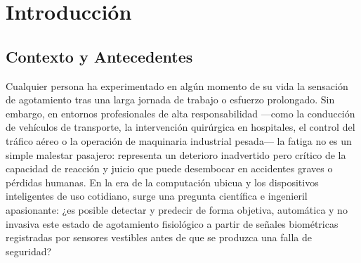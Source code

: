 
\chapter{Introducción}
\label{cap:introduccion}

\section{Contexto y Antecedentes}
\label{sec:intro_contexto}

Cualquier persona ha experimentado en algún momento de su vida la sensación de agotamiento tras una larga jornada de trabajo o esfuerzo prolongado. Sin embargo, en entornos profesionales de alta responsabilidad ---como la conducción de vehículos de transporte, la intervención quirúrgica en hospitales, el control del tráfico aéreo o la operación de maquinaria industrial pesada--- la fatiga no es un simple malestar pasajero: representa un deterioro inadvertido pero crítico de la capacidad de reacción y juicio que puede desembocar en accidentes graves o pérdidas humanas. En la era de la computación ubicua y los dispositivos inteligentes de uso cotidiano, surge una pregunta científica e ingenieril apasionante: ¿es posible detectar y predecir de forma objetiva, automática y no invasiva este estado de agotamiento fisiológico a partir de señales biométricas registradas por sensores vestibles antes de que se produzca una falla de seguridad?

